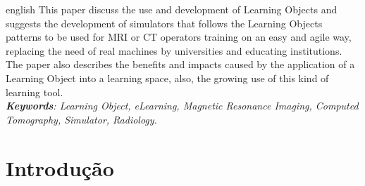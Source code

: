 \documentclass[12pt,openright,oneside,a4paper,english,french,spanish,brazil]{unifil}
\begin{document}
\par
\begin{resumo}[Abstract]
\begin{otherlanguage*}{english}
This paper discuss the use and development of Learning Objects and suggests the development of simulators that follows the Learning Objects patterns to be used for MRI or CT operators training on an easy and agile way, replacing the need of real machines by universities and educating institutions. The paper also describes the benefits and impacts caused by the application of a Learning Object into a learning space, also, the growing use of this kind of learning tool.
\emph{
}
\vspace{\onelineskip}\\
\noindent
\emph{	
\textbf{Keywords}: Learning Object, eLearning, Magnetic Resonance Imaging, Computed Tomography, Simulator, Radiology.
}
\end{otherlanguage*}
\end{resumo}


\tableofcontents*

  \setlength\absleftindent{0cm}
  \setlength\absrightindent{0cm}
  
  \abstracttextfont{\normalfont\normalsize}

  \setlength{\absparindent}{0pt}
  \setlength{\absparsep}{18pt}


\textual

\renewcommand{\ABNTEXchapterfont}{\fontfamily{cmr}\fontseries{b}\selectfont}
\renewcommand{\ABNTEXchapterfontsize}{\Large}

\renewcommand{\ABNTEXsectionfont}{\uppercase{\fontfamily{cmr}\fontseries{b}\selectfont}}
\renewcommand{\ABNTEXsectionfontsize}{\large}

\chapter{Introdução}
\end{document}
